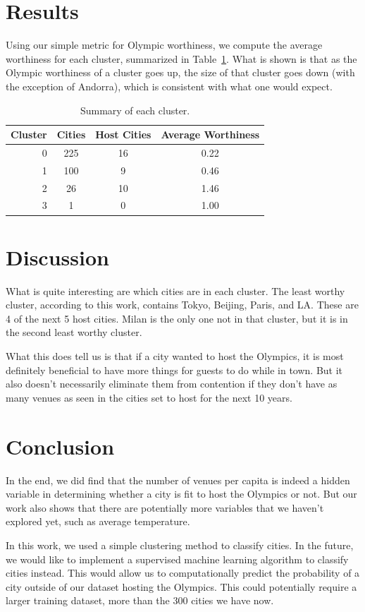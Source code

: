 \documentclass[
 reprint,
 amsmath,amssymb,
 aps,
prb,
floatfix
]{revtex4-2}
\begin{document}
\section{Results}
    Using our simple metric for Olympic worthiness, we compute the average worthiness for each cluster, summarized in Table~\ref{summary}. What is shown is that as the Olympic worthiness of a cluster goes up, the size of that cluster goes down (with the exception of Andorra), which is consistent with what one would expect.
    \begin{table}[h!]
        \centering
        \begin{tabular}{r|ccc}
            Cluster & Cities & Host Cities & Average Worthiness \\
            \hline\hline
            0 & 225 & 16 & 0.22 \\
            1 & 100 & 9  & 0.46 \\
            2 & 26  & 10 & 1.46 \\
            3 & 1   & 0  & 1.00
        \end{tabular}
        \caption{Summary of each cluster.}
        \label{summary}
    \end{table}

\section{Discussion}
    What is quite interesting are which cities are in each cluster. The least worthy cluster, according to this work, contains Tokyo, Beijing, Paris, and LA. These are 4 of the next 5 host cities. Milan is the only one not in that cluster, but it is in the second least worthy cluster.

    What this does tell us is that if a city wanted to host the Olympics, it is most definitely beneficial to have more things for guests to do while in town. But it also doesn't necessarily eliminate them from contention if they don't have as many venues as seen in the cities set to host for the next 10 years.

\section{Conclusion}
    In the end, we did find that the number of venues per capita is indeed a hidden variable in determining whether a city is fit to host the Olympics or not. But our work also shows that there are potentially more variables that we haven't explored yet, such as average temperature.

    In this work, we used a simple clustering method to classify cities. In the future, we would like to implement a supervised machine learning algorithm to classify cities instead. This would allow us to computationally predict the probability of a city outside of our dataset hosting the Olympics. This could potentially require a larger training dataset, more than the $300$ cities we have now.


\end{document}
